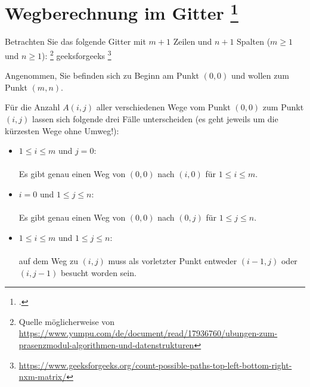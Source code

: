 \documentclass{bschlangaul-aufgabe}
\begin{document}

\section{Wegberechnung im Gitter
\footcite[Seite 1, Dynamische Programmierung, Aufgabe 2]{aud:ab:3}}

Betrachten Sie das folgende Gitter mit $m + 1$ Zeilen und $n + 1$
Spalten ($m \geq 1$ und $n \geq 1$):
\footnote{Quelle möglicherweise von \url{https://www.yumpu.com/de/document/read/17936760/ubungen-zum-prasenzmodul-algorithmen-und-datenstrukturen}}
geeksforgeeks
\footnote{\url{https://www.geeksforgeeks.org/count-possible-paths-top-left-bottom-right-nxm-matrix/}}

Angenommen, Sie befinden sich zu Beginn am Punkt $(0, 0)$ und wollen zum
Punkt $(m, n)$.

Für die Anzahl $A(i, j)$ aller verschiedenen Wege vom Punkt $(0, 0)$ zum
Punkt $(i, j)$ lassen sich folgende drei Fälle unterscheiden (es geht
jeweils um die kürzesten Wege
ohne Umweg!):

\begin{itemize}
\item $1 \leq i \leq m$ und $j = 0$:\\\\
Es gibt genau einen Weg von $(0, 0)$ nach $(i, 0)$ für
$1 \leq i \leq m$.

\item $i = 0$ und $1 \leq j \leq n$:\\\\
Es gibt genau einen Weg von $(0, 0)$ nach $(0, j)$ für
$1 \leq j \leq n$.

\item $1 \leq i \leq m$ und $1 \leq j \leq n$:\\\\
auf dem Weg zu $(i, j)$
muss als vorletzter Punkt entweder $(i-1, j)$ oder $(i, j-1)$ besucht
worden sein.
\end{itemize}
\end{document}
